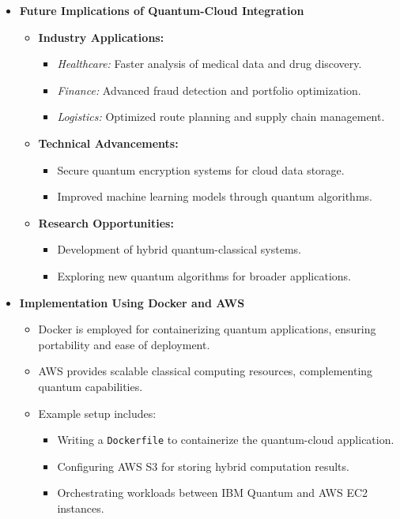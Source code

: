 \documentclass[12pt,a4paper]{article}
\begin{document}
\begin{itemize}
    \item \textbf{Future Implications of Quantum-Cloud Integration}
    \begin{itemize}
        \item \textbf{Industry Applications:}
        \begin{itemize}
            \item \textit{Healthcare:} Faster analysis of medical data and drug discovery.
            \item \textit{Finance:} Advanced fraud detection and portfolio optimization.
            \item \textit{Logistics:} Optimized route planning and supply chain management.
        \end{itemize}
        \item \textbf{Technical Advancements:}
        \begin{itemize}
            \item Secure quantum encryption systems for cloud data storage.
            \item Improved machine learning models through quantum algorithms.
        \end{itemize}
        \item \textbf{Research Opportunities:}
        \begin{itemize}
            \item Development of hybrid quantum-classical systems.
            \item Exploring new quantum algorithms for broader applications.
        \end{itemize}
    \end{itemize}

    \item \textbf{Implementation Using Docker and AWS}
    \begin{itemize}
        \item Docker is employed for containerizing quantum applications, ensuring portability and ease of deployment.
        \item AWS provides scalable classical computing resources, complementing quantum capabilities.
        \item Example setup includes:
        \begin{itemize}
            \item Writing a \texttt{Dockerfile} to containerize the quantum-cloud application.
            \item Configuring AWS S3 for storing hybrid computation results.
            \item Orchestrating workloads between IBM Quantum and AWS EC2 instances.
        \end{itemize}
    \end{itemize}

\end{itemize}
\end{document}
